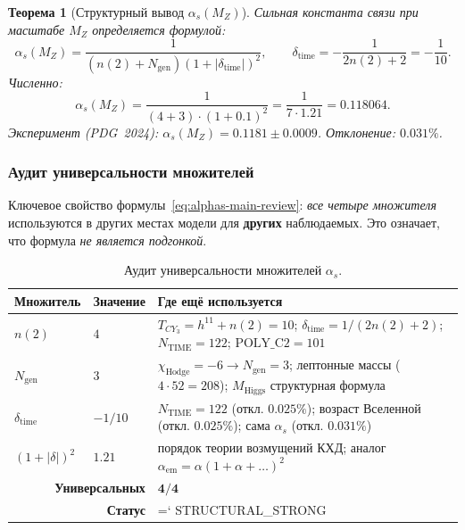 \documentclass[11pt,a4paper]{article}
\newcommand{\CY}{CY_3}
\newcommand{\Ngen}{N_{\text{gen}}}
\renewcommand{\texttt}[1]{{\ttfamily\hyphenchar\font=`\- #1}}
\newtheorem{theorem}{Теорема}[section]
\theoremstyle{definition}
\begin{document}
\begin{theorem}[Структурный вывод $\alpha_s(M_Z)$]
\label{thm:alphas-structural-review}
Сильная константа связи при масштабе $M_Z$ определяется 
формулой:
\begin{equation}
    \boxed{
    \alpha_s(M_Z) = \frac{1}{(n(2) + \Ngen)(1 + |\delta_{\text{time}}|)^2},
    \qquad
    \delta_{\text{time}} = -\frac{1}{2n(2) + 2} = -\frac{1}{10}.
    }
    \label{eq:alphas-main-review}
\end{equation}
Численно:
\begin{equation}
    \alpha_s(M_Z) = \frac{1}{(4 + 3) \cdot (1 + 0.1)^2}
    = \frac{1}{7 \cdot 1.21} = 0.118064.
\end{equation}
Эксперимент (PDG~2024): $\alpha_s(M_Z) = 0.1181 \pm 0.0009$.
Отклонение: $\mathbf{0.031\%}$.
\end{theorem}

\subsubsection{Аудит универсальности множителей}

Ключевое свойство формулы~\eqref{eq:alphas-main-review}: 
\emph{все четыре множителя} используются в других местах 
модели для \textbf{других} наблюдаемых. Это означает, что 
формула \emph{не является подгонкой}.

\begin{table}[htbp]
\centering
\caption{Аудит универсальности множителей $\alpha_s$.}
\label{tab:alphas-audit-review}
\begin{tabular}{p{2.5cm}p{1.5cm}p{8cm}}
\toprule
Множитель & Значение & Где ещё используется \\
\midrule
$n(2)$ & $4$ & 
    $T_{\CY} = h^{11} + n(2) = 10$;
    $\delta_{\text{time}} = 1/(2n(2)+2)$;
    $N_{\text{TIME}} = 122$;
    $\text{POLY\_C2} = 101$ \\[0.3em]
$\Ngen$ & $3$ & 
    $\chi_{\text{Hodge}} = -6 \to \Ngen = 3$;
    лептонные массы ($4 \cdot 52 = 208$);
    $M_{\text{Higgs}}$ структурная формула \\[0.3em]
$\delta_{\text{time}}$ & $-1/10$ & 
    $N_{\text{TIME}} = 122$ (откл. $0.025\%$);
    возраст Вселенной (откл. $0.025\%$);
    сама $\alpha_s$ (откл. $0.031\%$) \\[0.3em]
$(1+|\delta|)^2$ & $1.21$ & 
    порядок теории возмущений КХД;
    аналог $\alpha_{\text{em}} = \alpha(1 + \alpha + \ldots)^2$ \\
\midrule
\multicolumn{2}{r}{\textbf{Универсальных}} & $\mathbf{4/4}$ \\[0.2em]
\multicolumn{2}{r}{\textbf{Статус}} & \texttt{STRUCTURAL\_STRONG} \\
\bottomrule
\end{tabular}
\end{table}
\end{document}
